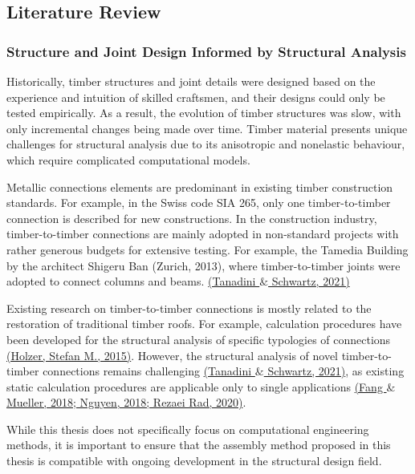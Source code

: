 \documentclass[11pt]{book}
\begin{document}
\subsection{Literature Review}

\subsubsection{Structure and Joint Design Informed by Structural Analysis}

Historically, timber structures and joint details were designed based on the experience and intuition of skilled craftsmen, and their designs could only be tested empirically. As a result, the evolution of timber structures was slow, with only incremental changes being made over time. Timber material presents unique challenges for structural analysis due to its anisotropic and nonelastic behaviour, which require complicated computational models. 

Metallic connections elements are predominant in existing timber construction standards. For example, in the Swiss code SIA 265, only one timber-to-timber connection is described for new constructions. In the construction industry, timber-to-timber connections are mainly adopted in non-standard projects with rather generous budgets for extensive testing. For example, the Tamedia Building by the architect Shigeru Ban (Zurich, 2013), where timber-to-timber joints were adopted to connect columns and beams. \href{https://www.zotero.org/google-docs/?9ElYpY}{(Tanadini $\&$ Schwartz, 2021)}

Existing research on timber-to-timber connections is mostly related to the restoration of traditional timber roofs. For example, calculation procedures have been developed for the structural analysis of specific typologies of connections \href{https://www.zotero.org/google-docs/?QbdDj9}{(Holzer, Stefan M., 2015)}. However, the structural analysis of novel timber-to-timber connections remains challenging \href{https://www.zotero.org/google-docs/?k50oK1}{(Tanadini $\&$ Schwartz, 2021)}, as existing static calculation procedures are applicable only to single applications \href{https://www.zotero.org/google-docs/?4OYa3q}{(Fang $\&$ Mueller, 2018; Nguyen, 2018; Rezaei Rad, 2020)}. 

While this thesis does not specifically focus on computational engineering methods, it is important to ensure that the assembly method proposed in this thesis is compatible with ongoing development in the structural design field.
\end{document}
